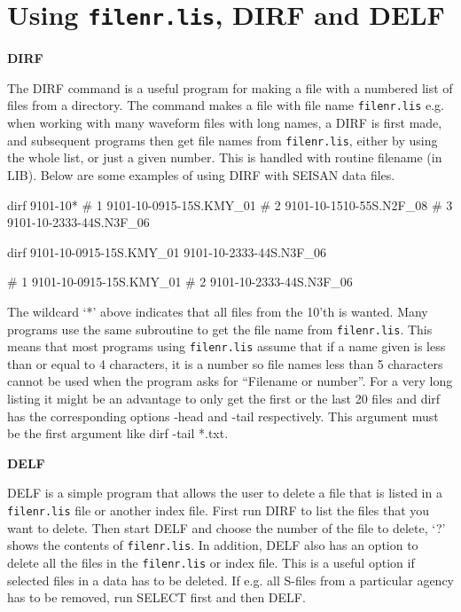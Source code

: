 \section{Using \texttt{filenr.lis}, DIRF and DELF}
\label{sect:dirf} 

\textbf{DIRF}

The DIRF command is a useful program for making a file with a numbered list of files from a directory. The command makes a file with file name \texttt{filenr.lis} e.g. when working with many waveform files with long names, a DIRF is first made, and subsequent programs then get file names from \texttt{filenr.lis}, either by using the whole list, or just a given number. This is handled with routine filename (in LIB). Below are some examples of using DIRF with SEISAN data files. 

\begin{boxedverbatim}
 dirf 9101-10* 
 #  1  9101-10-0915-15S.KMY_01
 #  2  9101-10-1510-55S.N2F_08
 #  3  9101-10-2333-44S.N3F_06 


 dirf 9101-10-0915-15S.KMY_01 9101-10-2333-44S.N3F_06           

 #  1  9101-10-0915-15S.KMY_01
 #  2  9101-10-2333-44S.N3F_06 

\end{boxedverbatim}

The wildcard `*' above indicates that all files from 
the 10'th is wanted. Many programs use the same subroutine to get 
the file name from \texttt{filenr.lis}. This means that most programs using 
\texttt{filenr.lis} assume that if a name given is less than or equal to 4 
characters, it is a number so file names less than 5 characters cannot 
be used when the program asks for ``Filename or number''. 
For a very long listing it might be an advantage to only get the first or the last 20 files and dirf has the corresponding options -head and -tail respectively.
This argument must be the first argument like dirf -tail *.txt.

\textbf{DELF}

DELF is a simple program that allows the user to delete 
a file that is listed in a \texttt{filenr.lis} file or another index file. 
First run DIRF to list the files that you want to delete. Then start 
DELF and choose the number of the file to delete, `?' shows the 
contents of \texttt{filenr.lis}. In addition, DELF also has an option to 
delete all the files in the \texttt{filenr.lis} or index file. This is a 
useful option if selected files in a data has to be deleted. If e.g. 
all S-files from a particular agency has to be removed, run SELECT 
first and then DELF. 

